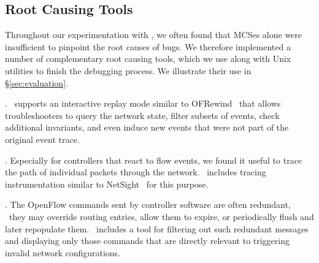 
\subsection{Root Causing Tools}
\label{subsec:root_causing}

Throughout our experimentation with \projectname, we often found that
MCSes alone were insufficient to
pinpoint the root causes of bugs. We therefore implemented a number of
complementary root
causing tools,
which we use along with Unix utilities to finish the debugging
process. We illustrate their use in \S\ref{sec:evaluation}.

. \projectname~supports an interactive replay mode
similar to OFRewind~\cite{ofrewind} that allows troubleshooters to query the
network state, filter subsets of events, check
additional invariants, and
even induce new events that were not part of the original event trace.

. Especially for controllers that react to
flow events, we found it useful to trace the path of individual
packets through the network. \projectname~includes tracing instrumentation
similar to NetSight~\cite{ndb14} for this purpose.

. The OpenFlow commands sent by controller software
are often redundant, \eg~they may override routing
entries, allow them to expire, or periodically flush
and later repopulate them. \projectname~includes a
tool for filtering out such redundant messages and
displaying only those commands that are directly relevant to triggering invalid network
configurations.

